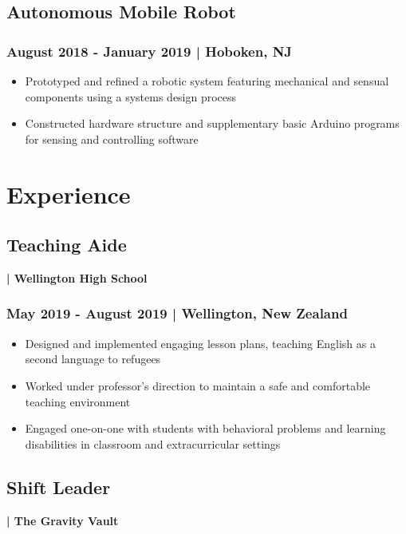 \documentclass[a4paper, 11pt]{article}
\newenvironment{tightemize}{\vspace{-\topsep}
\begin{itemize}[leftmargin=1em]\itemsep1pt \parskip0pt \parsep0pt}
{\end{itemize}\vspace{-\topsep}}
\begin{document}
\begin{minipage}[h]{0.63\textwidth}
\subsection{Autonomous Mobile Robot}
\subsubsection{August 2018 - January 2019 | Hoboken, NJ}
\vspace{-0.5em}
\begin{tightemize}
\fontsize{10}{0}\selectfont
\item{\textcolor{location}{Prototyped and refined a robotic system featuring mechanical and sensual components using a systems design process}}
\item{\textcolor{location}{Constructed hardware structure and supplementary basic Arduino programs for sensing and controlling software}}
\end{tightemize}
\vspace{-1em}
\section{Experience}
\subsection{Teaching Aide}\textbf{\textcolor{location}{| Wellington High School }}
\subsubsection{May 2019 - August 2019 | Wellington, New Zealand}
\vspace{-0.5em}
\begin{tightemize}
\item{\textcolor{location}{Designed and implemented engaging lesson plans, teaching English as a second language to refugees}}
\item{\textcolor{location}{Worked under professor’s direction to maintain a safe and comfortable teaching environment}}
\item{\textcolor{location}{Engaged one-on-one with students with behavioral problems and learning disabilities in classroom and extracurricular settings}}
\end{tightemize}
\vspace{-1em}
\subsection{Shift Leader}\textbf{\textcolor{location}{| The Gravity Vault }}

\end{minipage}
\end{document}
